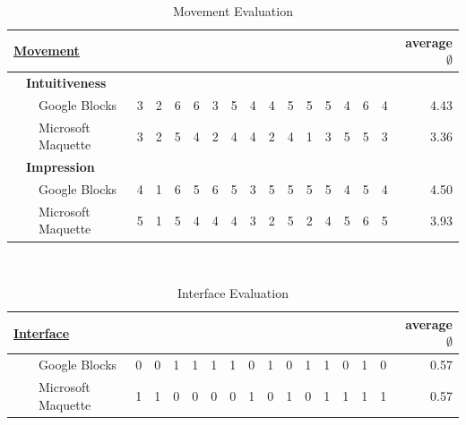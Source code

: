 \documentclass{report}
\begin{document}
		\begin{table}[H]			
			\begin{tabular}{@{}|lll|llllllllllllll|r|@{}}
				\hline
				\multicolumn{3}{|l|}{\textbf{\underline{Movement}}} & & & & & & & & & & & & & & & \textbf{average $\emptyset$} \\ \hline
				& \multicolumn{2}{l|}{\textbf{Intuitiveness}} & & & & & & & & & & & & & & &\\ \hline
				& & Google Blocks & 3 & 2 & 6 & 6 & 3 & 5 & 4 & 4 & 5 & 5 & 5 & 4 & 6 & 4 & 4.43 \\
				& & Microsoft Maquette & 3 & 2 & 5 & 4 & 2 & 4 & 4 & 2 & 4 & 1 & 3 & 5 & 5 & 3 & 3.36 \\ \hline
				
				& \multicolumn{2}{l|}{\textbf{Impression}} & & & & & & & & & & & & & & &\\ \hline
				& & Google Blocks & 4 & 1 & 6 & 5 & 6 & 5 & 3 & 5 & 5 & 5 & 5 & 4 & 5 & 4 & 4.50 \\
				& & Microsoft Maquette & 5 & 1 & 5 & 4 & 4 & 4 & 3 & 2 & 5 & 2 & 4 & 5 & 6 & 5 & 3.93 \\ \hline
			\end{tabular}	
			\caption{Movement Evaluation}
			\label{tab:tab3.2}	
		\end{table}
		\hfill \\
		\begin{table}[H]
			\begin{tabular}{@{}|lll|llllllllllllll|r|@{}}
				\hline
				\multicolumn{3}{|l|}{\textbf{\underline{Interface}}} & & & & & & & & & & & & & & & \textbf{average $\emptyset$} \\ \hline
				& & Google Blocks & 0 & 0 & 1 & 1 & 1 & 1 & 0 & 1 & 0 & 1 & 1 & 0 & 1 & 0 & 0.57 \\
				& & Microsoft Maquette & 1 & 1 & 0 & 0 & 0 & 0 & 1 & 0 & 1 & 0 & 1 & 1 & 1 & 1 & 0.57 \\ \hline
			\end{tabular}
			\caption{Interface Evaluation}
			\label{tab:tab3.3}
		\end{table}
		\hfill \\
\end{document}
